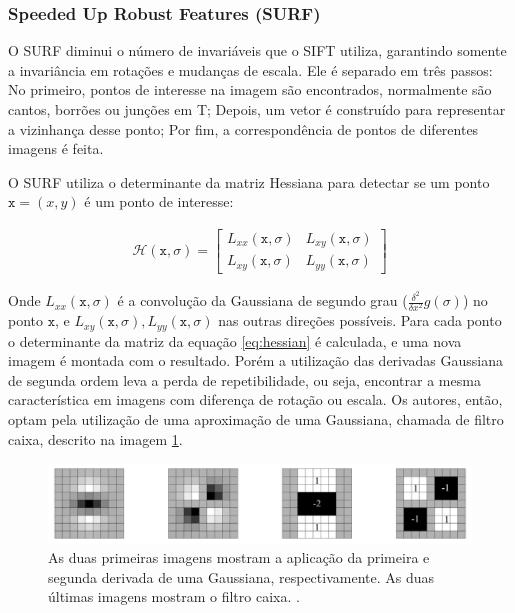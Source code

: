 \subsubsection{Speeded Up Robust Features (SURF)}

  O SURF diminui o número de invariáveis que o SIFT utiliza, garantindo somente a invariância em rotações e mudanças de
escala. Ele é separado em três passos: No primeiro, pontos de interesse na imagem são encontrados, normalmente são
cantos, borrões ou junções em T; Depois, um vetor é construído para representar a vizinhança desse ponto; Por fim, a
correspondência de pontos de diferentes imagens é feita.

  O SURF utiliza o determinante da matriz Hessiana para detectar se um ponto $\mathtt{x} = (x, y)$ é um ponto de
interesse:

\begin{align}\label{eq:hessian}
    \mathcal{H}(\mathtt{x}, \sigma) =
      \begin{bmatrix}
        L_{xx}(\mathtt{x}, \sigma) & L_{xy}(\mathtt{x}, \sigma) \\
        L_{xy}(\mathtt{x}, \sigma) & L_{yy}(\mathtt{x}, \sigma)
      \end{bmatrix}
\end{align}

  Onde $L_{xx}(\mathtt{x}, \sigma)$ é a convolução da Gaussiana de segundo grau ($ \frac{\delta^2}{\delta x^2} g(\sigma) $)
no ponto $\mathtt{x}$, e $L_{xy}(\mathtt{x}, \sigma), L_{yy}(\mathtt{x}, \sigma)$ nas outras direções possíveis. Para
cada ponto o determinante da matriz da equação \ref{eq:hessian} é calculada, e uma nova imagem é montada com o resultado.
Porém a utilização das derivadas Gaussiana de segunda ordem leva a perda de repetibilidade, ou seja, encontrar a mesma
característica em imagens com diferença de rotação ou escala. Os autores, então, optam pela utilização de uma aproximação
de uma Gaussiana, chamada de filtro caixa, descrito na imagem \ref{fig:box}.

\begin{figure}[H]
    \centering
    \includegraphics[width=1\textwidth]{figuras/boxFilter.png}
    \caption{As duas primeiras imagens mostram a aplicação da primeira e segunda derivada de uma Gaussiana,
             respectivamente. As duas últimas imagens mostram o filtro caixa. \cite{surfHolroyd}.}
    \label{fig:box}
\end{figure}

